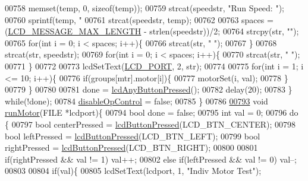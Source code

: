 \begin{DoxyCode}
{{{{{{{{{{{00758         memset(temp, 0, \textcolor{keyword}{sizeof}(temp));
00759         strcat(speedstr, \textcolor{stringliteral}{"Run Speed: "});
00760         sprintf(temp, \textcolor{stringliteral}{"%
00761         strcat(speedstr, temp);
00762 
00763         spaces = (\hyperlink{lcdmsg_8h_abe4c4b70fc6f44ae3680e5b2c68cdd00}{LCD\_MESSAGE\_MAX\_LENGTH} - strlen(speedstr))/2;
00764         strcpy(str, \textcolor{stringliteral}{""});
00765         \textcolor{keywordflow}{for}(\textcolor{keywordtype}{int} i = 0; i < spaces; i++)\{
00766             strcat(str, \textcolor{stringliteral}{" "});
00767         \}
00768         strcat(str, speedstr);
00769         \textcolor{keywordflow}{for}(\textcolor{keywordtype}{int} i = 0; i < spaces; i++)\{
00770             strcat(str, \textcolor{stringliteral}{" "});
00771         \}
00772 
00773         lcdSetText(\hyperlink{lcdmsg_8h_abcf42bd88b3c36193f301ca25b033875}{LCD\_PORT}, 2, str);
00774 
00775         \textcolor{keywordflow}{for}(\textcolor{keywordtype}{int} i = 1; i <= 10; i++)\{
00776             \textcolor{keywordflow}{if}(groups[mtr].motor[i])\{
00777                 motorSet(i, val);
00778             \}
00779         \}
00780 
00781         done = \hyperlink{lcddiag_8h_a0592813f995bfeeadb9bee923833ed35}{lcdAnyButtonPressed}();
00782         delay(20);
00783     \} \textcolor{keywordflow}{while}(!done);
00784     \hyperlink{lcddiag_8c_a0f0b335cd078d025d6fb720eb3bf6437}{disableOpControl} = \textcolor{keyword}{false};
00785 \}
00786 
\hypertarget{lcddiag_8c_source.tex_l00793}{}\hyperlink{lcddiag_8c_a3391c1825bcf4987f3fad9f42a9c1f0d}{00793} \textcolor{keywordtype}{void} \hyperlink{lcddiag_8c_a3391c1825bcf4987f3fad9f42a9c1f0d}{runMotor}(FILE *lcdport)\{
00794     \textcolor{keywordtype}{bool} done = \textcolor{keyword}{false};
00795     \textcolor{keywordtype}{int} val = 0;
00796     \textcolor{keywordflow}{do} \{
00797         \textcolor{keywordtype}{bool} centerPressed = \hyperlink{lcddiag_8h_a74e4c744db49f9b7b645095575e152ad}{lcdButtonPressed}(LCD\_BTN\_CENTER);
00798         \textcolor{keywordtype}{bool} leftPressed = \hyperlink{lcddiag_8h_a74e4c744db49f9b7b645095575e152ad}{lcdButtonPressed}(LCD\_BTN\_LEFT);
00799         \textcolor{keywordtype}{bool} rightPressed = \hyperlink{lcddiag_8h_a74e4c744db49f9b7b645095575e152ad}{lcdButtonPressed}(LCD\_BTN\_RIGHT);
00800 
00801         \textcolor{keywordflow}{if}(rightPressed && val != 1) val++;
00802         \textcolor{keywordflow}{else} \textcolor{keywordflow}{if}(leftPressed && val != 0) val--;
00803 
00804         \textcolor{keywordflow}{if}(val)\{
00805             lcdSetText(lcdport, 1, \textcolor{stringliteral}{"Indiv Motor Test"});
}}}}}}}}}}}}
\end{DoxyCode}
